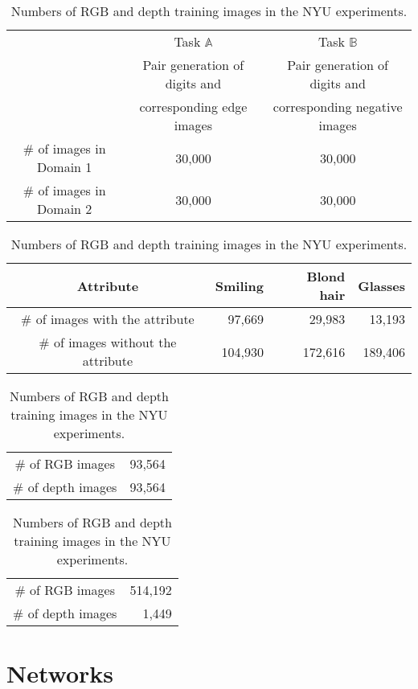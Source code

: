 \documentclass{article}
\begin{document}
\begin{table}[tbh!]
\centering
{ 
\caption{Numbers of training images in Domain 1 and Domain 2 in the MNIST experiments.}
\label{tbl::dataset_digit_count}
\begin{tabular}{ccc}
\hline
 & Task $\mathbb{A}$ 						 & Task $\mathbb{B}$ \\
 & Pair generation of digits and & Pair generation of digits and \\
 & corresponding edge images     & corresponding negative images\\ 
\hline
\# of images in Domain 1 & 30,000 & 30,000 \\
\# of images in Domain 2 & 30,000 & 30,000 \\
\hline
\end{tabular}}
\centering
{ 
\vspace{4mm}
\caption{Numbers of training images of different attributes in the pair face generation experiments.}
\label{tbl::dataset_attr_count}
\begin{tabular}{crrr}
\hline
Attribute & Smiling & Blond hair & Glasses\\
\hline
\# of images with the attribute & 97,669 & 29,983 & 13,193\\
\# of images without the attribute & 104,930  & 172,616 & 189,406\\
\hline
\end{tabular}}
\centering
{ 
\vspace{4mm}
\caption{Numbers of RGB and depth training images in the RGBD experiments.}
\label{tbl::dataset_rgbd_count}
\begin{tabular}{cc}
\hline
\# of RGB images   & 93,564 \\
\# of depth images & 93,564 \\
\hline
\end{tabular}}
\centering
{ 
\vspace{4mm}
\caption{Numbers of RGB and depth training images in the NYU experiments.}
\label{tbl::dataset_nyu_count}
\begin{tabular}{cr}
\hline
\# of RGB images   & 514,192 \\
\# of depth images & 1,449 \\
\hline
\end{tabular}}
\end{table}
 
\section{Networks}\label{subsec::nets}
\end{document}
